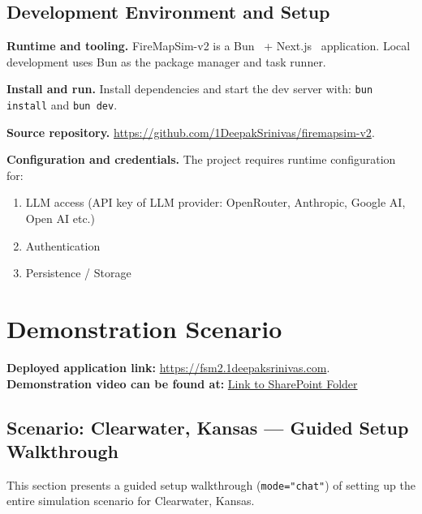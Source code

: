 \documentclass[12pt]{article}
\begin{document}
\subsection{Development Environment and Setup}

\textbf{Runtime and tooling.} FireMapSim-v2 is a Bun~\cite{bun} + Next.js~\cite{nextjs} application.
Local development uses Bun as the package manager and task runner.

\textbf{Install and run.} Install dependencies and start the dev server with:
\texttt{bun install} and \texttt{bun dev}.

\textbf{Source repository.} \url{https://github.com/1DeepakSrinivas/firemapsim-v2}.

\textbf{Configuration and credentials.} The project requires runtime 
configuration for:
\begin{enumerate}
    \item LLM access (API key of LLM provider: OpenRouter, Anthropic, Google AI, Open AI etc.)
    \item Authentication
    \item Persistence / Storage
\end{enumerate}
\section{Demonstration Scenario}
 
\textbf{Deployed application link: }
\url{https://fsm2.1deepaksrinivas.com}.\\
\textbf{Demonstration video can be found at: }\href{https://studentgsu-my.sharepoint.com/:f:/g/personal/dg1_student_gsu_edu/IgAzkP_y2Yd3RZdQWtPKkcMoAdjpINCLZv88UWaDKpnDWgM?e=P2Qxod}{Link to SharePoint Folder}

\subsection{Scenario: Clearwater, Kansas --- Guided Setup Walkthrough}
This section presents a guided setup walkthrough (\texttt{mode="chat"}) of setting up the entire simulation scenario for Clearwater, Kansas.
\end{document}
